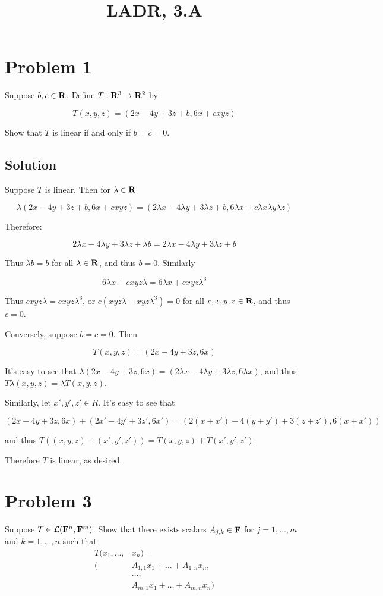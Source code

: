\documentclass{article}
\title{LADR, 3.A}
\begin{document}
\maketitle

\section*{Problem 1}
Suppose $b,c\in\mathbf{R}$. Define $T: \mathbf{R}^3\to\mathbf{R}^2$ by

\[T(x, y, z)=(2x-4y+3z+b, 6x+cxyz)\]

Show that $T$ is linear if and only if $b=c=0$.

\subsection*{Solution}
Suppose $T$ is linear. Then for $\lambda\in\mathbf{R}$

\[\lambda(2x-4y+3z+b, 6x+cxyz)=(2\lambda x-4\lambda y+3\lambda z+b, 6\lambda x+c\lambda x\lambda y\lambda z)\]

Therefore:

\[2\lambda x-4\lambda y+3\lambda z+\lambda b=2\lambda x-4\lambda y+3\lambda z+b\]

Thus $\lambda b = b$ for all $\lambda\in\mathbf{R}$, and thus $b=0$. Similarly

\[6\lambda x+ cxyz\lambda=6\lambda x + cxyz\lambda^3\]

Thus $cxyz\lambda=cxyz\lambda^3$, or $c(xyz\lambda-xyz\lambda^3)=0$ for all $c, x, y, z\in\mathbf{R}$, and thus $c=0$.

\vs

Conversely, suppose $b=c=0$. Then

\[T(x, y, z)=(2x-4y+3z, 6x)\]

It's easy to see that $\lambda (2x-4y+3z, 6x)=(2\lambda x-4\lambda y+3\lambda z, 6\lambda x)$, and thus $T\lambda(x, y, z)=\lambda T(x, y, z)$.

\vs

Similarly, let $x', y', z'\in R$. It's easy to see that

\[(2x-4y+3z, 6x)+(2x'-4y'+3z', 6x')=(2(x+x')-4(y+y')+3(z+z'), 6(x+x'))\]

and thus $T((x, y, z) + (x', y', z'))=T(x, y, z)+T(x', y', z')$.

\vs

Therefore $T$ is linear, as desired.

\section*{Problem 3}
Suppose $T\in\mathcal{L}(\mathbf{F}^n, \mathbf{F}^m)$. Show that there exists scalars $A_{j,k}\in\mathbf{F}$ for $j=1,\ldots,m$ and $k=1,\ldots,n$ such that
\begin{align*}
T(x_1,\ldots,&x_n)=\\(&A_{1,1}x_1+\ldots+A_{1,n}x_n,\\
&\ldots,\\
&A_{m,1}x_1+\ldots+A_{m,n}x_n)
\end{align*}
\end{document}
